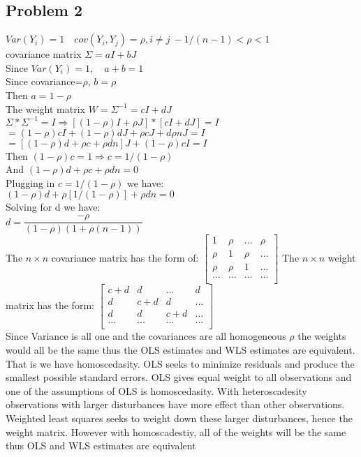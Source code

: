 \documentclass{article}
\begin{document}
\begin{flushleft}
\section*{Problem 2}
$Var(Y_i)=1 \quad cov(Y_i,Y_j)=\rho, i\neq j \ -1/(n-1)<\rho<1$\\
covariance matrix $\Sigma=aI+bJ$\\
Since $Var(Y_i)=1, \quad a+b=1$\\
Since covariance=$\rho$, $b=\rho$\\
Then $a=1-\rho$\\
The weight matrix $W=\Sigma^{-1}=cI+dJ$\\
$\Sigma*\Sigma^{-1}=I \Rightarrow [(1-\rho)I+\rho J]*[cI+dJ]=I$\\
$=(1-\rho)cI+(1-\rho)dJ+\rho cJ+d\rho nJ=I$\\
$=[(1-\rho)d+\rho c+\rho dn]J+(1-\rho)cI=I$\\
Then $(1-\rho)c=1 \Rightarrow c=1/(1-\rho)$\\
And $(1-\rho)d+\rho c+\rho dn=0$\\
Plugging in $c=1/(1-\rho)$ we have:\\
$(1-\rho)d+\rho [1/(1-\rho)]+\rho dn=0$\\
Solving for d we have:\\
$d=\dfrac{-\rho}{(1-\rho)(1+\rho(n-1))}$\\
The $n\times n$ covariance matrix has the form of: $\begin{bmatrix}
1 & \rho & \dots & \rho\\
\rho & 1 & \rho & \dots\\
\rho & \rho & 1 & \dots\\
\dots & \dots & \dots & \dots\\
\end{bmatrix}$\medbreak
The $n\times n$ weight matrix has the form:
 $\begin{bmatrix}
c+d & d & \dots & d\\
d & c+d & d & \dots\\
d & d & c+d & \dots\\
\dots & \dots & \dots & \dots\\
\end{bmatrix}$\\
Since Variance is all one and the covariances are all homogeneous $\rho$ the weights would all be the same thus the OLS estimates and WLS estimates are equivalent. That is we have homoscedasity. OLS seeks to minimize residuals and produce the smallest possible standard errors. OLS gives equal weight to all observations and one of the assumptions of OLS is homoscedasity. With heteroscadesity observations with larger disturbances have more effect than other observations. Weighted least squares seeks to weight down these larger disturbances, hence the weight matrix. However with homoscadestiy, all of the weights will be the same thus OLS and WLS estimates are equivalent

\end{flushleft}
\end{document}
